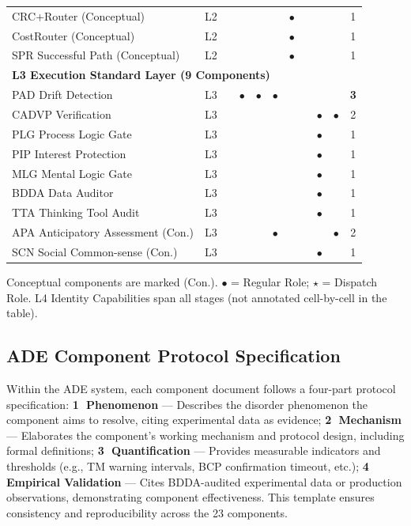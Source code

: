 \documentclass[11pt,a4paper]{article}
\begin{document}
\begin{table}[htbp]
\begin{tabular}{p{}cccccccccc}
CRC+Router (Conceptual) & L2 & & & & & $\bullet$ & & & & 1 \\
CostRouter (Conceptual) & L2 & & & & & $\bullet$ & & & & 1 \\
SPR Successful Path (Conceptual) & L2 & & & & & $\bullet$ & & & & 1 \\
\hline
\multicolumn{11}{l}{\textbf{L3 Execution Standard Layer (9 Components)}} \\
\hline
PAD Drift Detection & L3 & & $\bullet$ & $\bullet$ & $\bullet$ & & & & & \textbf{3} \\
CADVP Verification & L3 & & & & & & & $\bullet$ & $\bullet$ & 2 \\
PLG Process Logic Gate & L3 & & & & & & & $\bullet$ & & 1 \\
PIP Interest Protection & L3 & & & & & & & $\bullet$ & & 1 \\
MLG Mental Logic Gate & L3 & & & & & & & $\bullet$ & & 1 \\
BDDA Data Auditor & L3 & & & & & & & $\bullet$ & & 1 \\
TTA Thinking Tool Audit & L3 & & & & & & & $\bullet$ & & 1 \\
APA Anticipatory Assessment (Con.) & L3 & & & & $\bullet$ & & & & $\bullet$ & 2 \\
SCN Social Common-sense (Con.) & L3 & & & & & & & $\bullet$ & & 1 \\
\hline
\end{tabular}
\end{table}

{\footnotesize Conceptual components are marked (Con.). $\bullet$ = Regular Role; $\star$ = Dispatch Role. L4 Identity Capabilities span all stages (not annotated cell-by-cell in the table).}

\subsection{ADE Component Protocol Specification}
\label{sec:10.2}

Within the ADE system, each component document follows a four-part protocol specification:
\textbf{\textcircled{1} Phenomenon} --- Describes the disorder phenomenon the component aims to resolve, citing experimental data as evidence;
\textbf{\textcircled{2} Mechanism} --- Elaborates the component's working mechanism and protocol design, including formal definitions;
\textbf{\textcircled{3} Quantification} --- Provides measurable indicators and thresholds (e.g., TM warning intervals, BCP confirmation timeout, etc.);
\textbf{\textcircled{4} Empirical Validation} --- Cites BDDA-audited experimental data or production observations, demonstrating component effectiveness.
This template ensures consistency and reproducibility across the 23 components.
\end{document}
